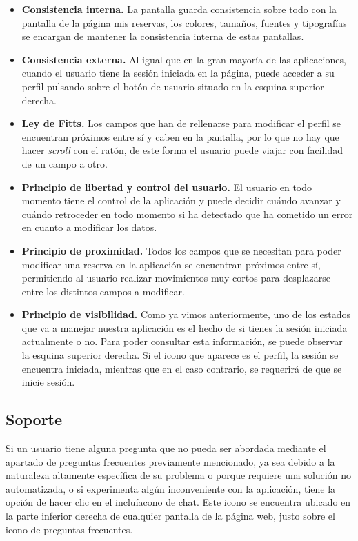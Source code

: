 \begin{itemize}
    \item \textbf{Consistencia interna.} La pantalla guarda consistencia sobre todo con la pantalla de la página
        mis reservas, los colores, tamaños, fuentes y tipografías se encargan de mantener la consistencia interna de
        estas pantallas.
    \item \textbf{Consistencia externa.} Al igual que en la gran mayoría de las aplicaciones, cuando el usuario tiene
        la sesión iniciada en la página, puede acceder a su perfil pulsando sobre el botón de usuario situado en la
        esquina superior derecha.
    \item \textbf{Ley de Fitts.} Los campos que han de rellenarse para modificar el perfil se encuentran próximos
        entre sí y caben en la pantalla, por lo que no hay que hacer \textit{scroll} con el ratón, de este forma
        el usuario puede viajar con facilidad de un campo a otro.
    \item \textbf{Principio de libertad y control del usuario.} El usuario en todo momento tiene el control de la
        aplicación y puede decidir cuándo avanzar y cuándo retroceder en todo momento si ha detectado que ha cometido
        un error en cuanto a modificar los datos.
    \item \textbf{Principio de proximidad.} Todos los campos que se necesitan para poder modificar una reserva en
        la aplicación se encuentran próximos entre sí, permitiendo al usuario realizar movimientos muy cortos para
        desplazarse entre los distintos campos a modificar.
    \item \textbf{Principio de visibilidad.} Como ya vimos anteriormente, uno de los estados que va a manejar nuestra
        aplicación es el hecho de si tienes la sesión iniciada actualmente o no. Para poder consultar esta
        información, se puede observar la esquina superior derecha. Si el icono que aparece es el perfil, la sesión
        se encuentra iniciada, mientras que en el caso contrario, se requerirá de que se inicie sesión.
\end{itemize}

\subsection*{Soporte}

Si un usuario tiene alguna pregunta que no pueda ser abordada mediante el apartado de preguntas frecuentes previamente
mencionado, ya sea debido a la naturaleza altamente específica de su problema o porque requiere una solución no
automatizada, o si experimenta algún inconveniente con la aplicación, tiene la opción de hacer clic en el incluíacono de
chat. Este icono se encuentra ubicado en la parte inferior derecha de cualquier pantalla de la página web, justo sobre
el icono de preguntas frecuentes.

